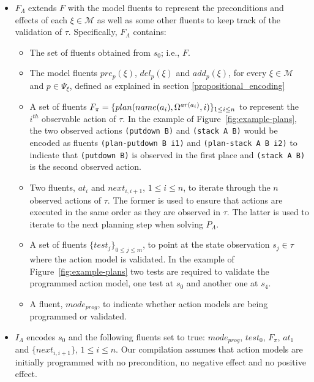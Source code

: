 \documentclass[runningheads]{llncs}
\begin{document}
\begin{itemize}

\item $F_{\Lambda}$ extends $F$ with the model fluents to represent the preconditions and effects of each $\xi\in\mathcal{M}$ as well as some other fluents to keep track of the validation of $\tau$. Specifically, $F_{\Lambda}$ contains:
\begin{itemize}
\item The set of fluents obtained from $s_0$; i.e., $F$.
\item The model fluents $pre_p(\xi)$, $del_p(\xi)$ and $add_p(\xi)$, for every $\xi \in \mathcal{M}$ and $p\in \Psi_{\xi}$, defined as explained in section \ref{propositional_encoding}
\item A set of fluents $F_{\pi}=\{plan(name(a_i),\Omega^{ar(a_i)},i)\}_{\small 1\leq i\leq n}$ to represent the $i^{th}$ observable action of $\tau$. In the example of Figure~\ref{fig:example-plans}, the two observed actions {\small \texttt{(putdown B)}} and {\small \texttt{(stack  A  B)}} would be encoded as fluents  {\small \texttt{(plan-putdown B i1)}} and {\small \texttt{(plan-stack A B i2)}} to indicate that {\small \texttt{(putdown B)}} is observed in the first place and {\small \texttt{(stack  A  B)}} is the second observed action.
\item Two fluents, $at_i$ and $next_{i,i+1}$, {\small $1\leq i \leq n$}, to iterate through the $n$ observed actions of $\tau$. The former is used to ensure that actions are executed in the same order as they are observed in $\tau$. The latter is used to iterate to the next planning step when solving $P_{\Lambda}$.
\item A set of fluents $\{test_j\}_{0\leq j\leq m}$, to point at the state observation $s_j\in\tau$ where the action model is
validated. In the example of Figure~\ref{fig:example-plans} two tests are required to validate the programmed action model, one test at $s_0$ and another one at $s_4$.
\item A fluent, $mode_{prog}$, to indicate whether action models are being programmed or validated.
\end{itemize}

\item $I_{\Lambda}$ encodes $s_0$ and the following fluents set to true: $mode_{prog}$, $test_0$, $F_{\pi}$, $at_1$ and $\{next_{i,i+1}\}$, {\small $1\leq i \leq n$}. Our compilation assumes that action models are initially programmed with no precondition, no negative effect and no positive effect.


\end{itemize}
\end{document}
